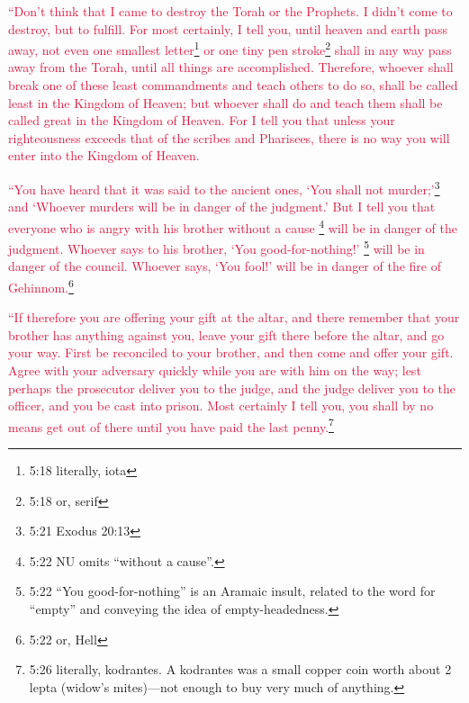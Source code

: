\myverse{}\textcolor{crimson}{“Don’t think that I came to destroy the Torah or the Prophets.
	I didn’t come to destroy, but to fulfill.
}
\myverse{}\textcolor{crimson}{For most certainly, I tell you, until heaven and earth pass away, not
	even one smallest letter}\footnote{5:18 literally, iota}
\textcolor{crimson}{or one tiny pen stroke}\footnote{5:18 or, serif}
\textcolor{crimson}{shall in any way pass away from the Torah, until all things are accomplished.
}
\myverse{}\textcolor{crimson}{Therefore, whoever shall break one of these least commandments and teach
	others to do so, shall be called least in the Kingdom of Heaven; but whoever shall do and teach them shall
	be called great in the Kingdom of Heaven.
}
\myverse{}\textcolor{crimson}{For I tell you that unless your righteousness exceeds that of the scribes
	and Pharisees, there is no way you will enter into the Kingdom of Heaven.}

\myverse{}\textcolor{crimson}{“You have heard that it was said to the ancient ones, ‘You
	shall not murder;’}\footnote{5:21 Exodus 20:13}
\textcolor{crimson}{and ‘Whoever murders will be in danger of the judgment.’
}
\myverse{}\textcolor{crimson}{But I tell you that everyone who is angry with his brother without a cause
}\footnote{5:22 NU omits “without a cause”.}
\textcolor{crimson}{will be in danger of the judgment. Whoever says to his brother, ‘You good-for-nothing!’
}\footnote{5:22 “You good-for-nothing” is an Aramaic insult, related to the word for “empty” and conveying the
	idea of empty-headedness.}
\textcolor{crimson}{will be in danger of the council. Whoever says, ‘You fool!’ will be in danger of the fire of Gehinnom.}\footnote{5:22 or, Hell}

\myverse{}\textcolor{crimson}{“If therefore you are offering your gift at the altar, and
	there remember that your brother has anything against you,
}
\myverse{}\textcolor{crimson}{leave your gift there before the altar, and go your way. First be reconciled
	to your brother, and then come and offer your gift.
}
\myverse{}\textcolor{crimson}{Agree with your adversary quickly while you are with him on the way; lest
	perhaps the prosecutor deliver you to the judge, and the judge deliver you to the officer, and you be
	cast into prison.
}
\myverse{}\textcolor{crimson}{Most certainly I tell you, you shall by no means get out of there until
	you have paid the last penny.}\footnote{5:26 literally, kodrantes. A kodrantes was a small copper coin worth about 2 lepta (widow’s mites)—not
	enough to buy very much of anything.}

